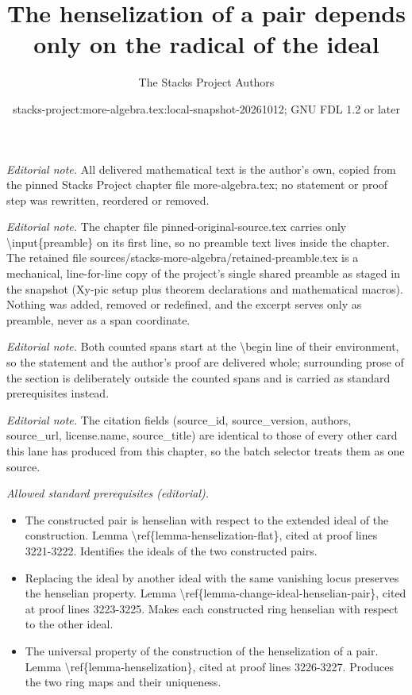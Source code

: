 \documentclass[10pt,a4paper]{amsart}
\title{The henselization of a pair depends only on the radical of the ideal}
\author{The Stacks Project Authors}
\date{stacks-project:more-algebra.tex:local-snapshot-20261012; GNU FDL 1.2 or later}
\theoremstyle{plain}
\theoremstyle{definition}
\theoremstyle{remark}
\numberwithin{equation}{subsection}
\begin{document}
\maketitle
\setcounter{subsection}{1}
\noindent\textit{Editorial note.} All delivered mathematical text is the author's own, copied from the pinned Stacks Project chapter file more-algebra.tex; no statement or proof step was rewritten, reordered or removed.\par\medskip
\noindent\textit{Editorial note.} The chapter file pinned-original-source.tex carries only \textbackslash{}input\{preamble\} on its first line, so no preamble text lives inside the chapter. The retained file sources/stacks-more-algebra/retained-preamble.tex is a mechanical, line-for-line copy of the project's single shared preamble as staged in the snapshot (Xy-pic setup plus theorem declarations and mathematical macros). Nothing was added, removed or redefined, and the excerpt serves only as preamble, never as a span coordinate.\par\medskip
\noindent\textit{Editorial note.} Both counted spans start at the \textbackslash{}begin line of their environment, so the statement and the author's proof are delivered whole; surrounding prose of the section is deliberately outside the counted spans and is carried as standard prerequisites instead.\par\medskip
\noindent\textit{Editorial note.} The citation fields (source\_id, source\_version, authors, source\_url, license.name, source\_title) are identical to those of every other card this lane has produced from this chapter, so the batch selector treats them as one source.\par\medskip
\noindent\textit{Allowed standard prerequisites (editorial).}\begin{itemize}
\item The constructed pair is henselian with respect to the extended ideal of the construction. Lemma \textbackslash{}ref\{lemma-henselization-flat\}, cited at proof lines 3221-3222. Identifies the ideals of the two constructed pairs.
\item Replacing the ideal by another ideal with the same vanishing locus preserves the henselian property. Lemma \textbackslash{}ref\{lemma-change-ideal-henselian-pair\}, cited at proof lines 3223-3225. Makes each constructed ring henselian with respect to the other ideal.
\item The universal property of the construction of the henselization of a pair. Lemma \textbackslash{}ref\{lemma-henselization\}, cited at proof lines 3226-3227. Produces the two ring maps and their uniqueness.
\end{itemize}\medskip
\end{document}
